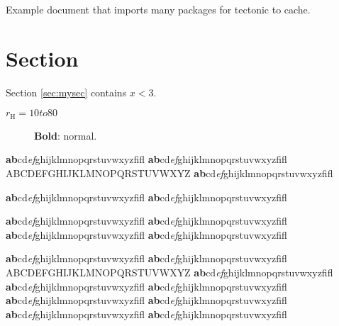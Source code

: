 \documentclass[a4paper,twoside,11pt]{article}
\begin{document}

\setcounter{tocdepth}{2}
\tableofcontents
\cleardoublepage

Example document that imports many packages for tectonic to cache.

\section{Section}{}\label{sec:mysec}
Section \ref{sec:mysec} contains $x < 3$.

$r_\textrm{H}=10 to 80$

\begin{sidewaysfigure}[ht]
  \centering
  \caption{\textbf{Bold}: normal.}
  \label{fig:myfig}
\end{sidewaysfigure}

\normalsize

\textbf{ab}cd\textit{ef}ghijklmnopqrstuvwxyzfifl \fontname\font
{\selectfont \textbf{ab}cd\textit{ef}ghijklmnopqrstuvwxyzfifl \fontname\font}
{\selectfont ABCDEFGHIJKLMNOPQRSTUVWXYZ \fontname\font}
{\selectfont \textbf{ab}cd\textit{ef}ghijklmnopqrstuvwxyzfifl \fontname\font}

{\selectfont \textbf{ab}cd\textit{ef}ghijklmnopqrstuvwxyzfifl \fontname\font}
{\selectfont \textbf{ab}cd\textit{ef}ghijklmnopqrstuvwxyzfifl \fontname\font}

{\selectfont \textbf{ab}cd\textit{ef}ghijklmnopqrstuvwxyzfifl \fontname\font}
{\selectfont \textbf{ab}cd\textit{ef}ghijklmnopqrstuvwxyzfifl \fontname\font}
{\selectfont \textbf{ab}cd\textit{ef}ghijklmnopqrstuvwxyzfifl \fontname\font}
{\selectfont \textbf{ab}cd\textit{ef}ghijklmnopqrstuvwxyzfifl \fontname\font}

\large

\textbf{ab}cd\textit{ef}ghijklmnopqrstuvwxyzfifl \fontname\font
{\selectfont \textbf{ab}cd\textit{ef}ghijklmnopqrstuvwxyzfifl \fontname\font}
{\selectfont ABCDEFGHIJKLMNOPQRSTUVWXYZ \fontname\font}
{\selectfont \textbf{ab}cd\textit{ef}ghijklmnopqrstuvwxyzfifl \fontname\font}
{\selectfont \textbf{ab}cd\textit{ef}ghijklmnopqrstuvwxyzfifl \fontname\font}
{\selectfont \textbf{ab}cd\textit{ef}ghijklmnopqrstuvwxyzfifl \fontname\font}
{\selectfont \textbf{ab}cd\textit{ef}ghijklmnopqrstuvwxyzfifl \fontname\font}
{\selectfont \textbf{ab}cd\textit{ef}ghijklmnopqrstuvwxyzfifl \fontname\font}
{\selectfont \textbf{ab}cd\textit{ef}ghijklmnopqrstuvwxyzfifl \fontname\font}
{\selectfont \textbf{ab}cd\textit{ef}ghijklmnopqrstuvwxyzfifl \fontname\font}
\end{document}
